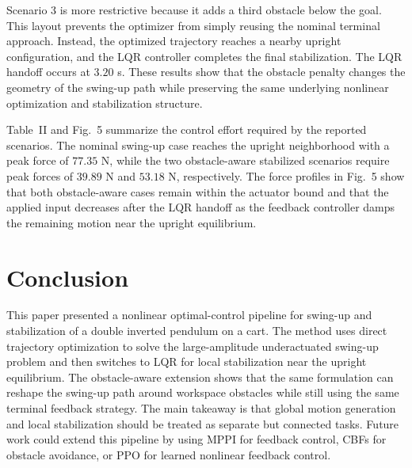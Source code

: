 \documentclass[conference]{IEEEtran}
\begin{document}
Scenario 3 is more restrictive because it adds a third obstacle below the goal. This layout prevents the optimizer from simply reusing the nominal terminal approach. Instead, the optimized trajectory reaches a nearby upright configuration, and the LQR controller completes the final stabilization. The LQR handoff occurs at $3.20$ s. These results show that the obstacle penalty changes the geometry of the swing-up path while preserving the same underlying nonlinear optimization and stabilization structure.

Table~II and Fig.~5 summarize the control effort required by the reported scenarios. The nominal swing-up case reaches the upright neighborhood with a peak force of $77.35$ N, while the two obstacle-aware stabilized scenarios require peak forces of $39.89$ N and $53.18$ N, respectively. The force profiles in Fig.~5 show that both obstacle-aware cases remain within the actuator bound and that the applied input decreases after the LQR handoff as the feedback controller damps the remaining motion near the upright equilibrium.

\section{Conclusion}
This paper presented a nonlinear optimal-control pipeline for swing-up and stabilization of a double inverted pendulum on a cart. The method uses direct trajectory optimization to solve the large-amplitude underactuated swing-up problem and then switches to LQR for local stabilization near the upright equilibrium. The obstacle-aware extension shows that the same formulation can reshape the swing-up path around workspace obstacles while still using the same terminal feedback strategy. The main takeaway is that global motion generation and local stabilization should be treated as separate but connected tasks. Future work could extend this pipeline by using MPPI for feedback control, CBFs for obstacle avoidance, or PPO for learned nonlinear feedback control.


\end{document}
